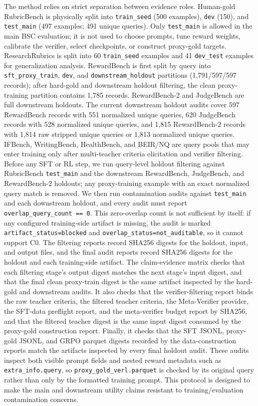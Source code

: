 The method relies on strict separation between evidence roles. Human-gold
RubricBench is physically split into \texttt{train\_seed} (500 examples),
\texttt{dev} (150), and \texttt{test\_main} (497 examples; 491 unique
queries). Only \texttt{test\_main} is
allowed in the main BSC evaluation; it is not used to choose prompts, tune
reward weights, calibrate the verifier, select checkpoints, or construct
proxy-gold targets. ResearchRubrics is split into 60
\texttt{train\_seed} examples and 41 \texttt{dev\_test} examples for
generalization analysis. RewardBench is first split by query into
\texttt{sft\_proxy\_train}, \texttt{dev}, and
\texttt{downstream\_holdout} partitions (1,791/597/597 records); after
hard-gold and downstream holdout filtering, the clean proxy-training partition
contains 1,785 records. RewardBench-2 and JudgeBench are full downstream
holdouts. The current downstream holdout audits cover 597 RewardBench records
with 551 normalized unique queries, 620 JudgeBench records with 528 normalized
unique queries, and 1,815 RewardBench-2 records with 1,814 raw stripped unique
queries or 1,813 normalized unique queries. IFBench, WritingBench, HealthBench,
and BEIR/NQ are query pools that
may enter training only after multi-teacher criteria elicitation and verifier
filtering. Before any SFT or RL step, we run query-level holdout filtering
against RubricBench \texttt{test\_main} and the downstream RewardBench,
JudgeBench, and RewardBench-2 holdouts; any proxy-training example with an exact
normalized query match is removed. We then run contamination audits against
\texttt{test\_main} and each downstream holdout, and every audit must report
\texttt{overlap\_query\_count == 0}. This zero-overlap count is not sufficient
by itself: if any configured training-side artifact is missing, the audit is
marked \texttt{artifact\_status=blocked} and
\texttt{overlap\_status=not\_auditable}, so it cannot support C0. The filtering reports record SHA256
digests for the holdout, input, and output files, and the final audit reports
record SHA256 digests for the holdout and each training-side artifact. The
claim-evidence matrix checks that each filtering stage's output digest matches
the next stage's input digest, and that the final clean proxy-train digest is
the same artifact inspected by the hard-gold and downstream audits. It also
checks that the verifier-filtering report binds the raw teacher criteria, the
filtered teacher criteria, the Meta-Verifier provider, the SFT-data preflight
report, and the meta-verifier budget report by SHA256, and that the filtered
teacher digest is the same input digest consumed by the proxy-gold construction
report. Finally, it checks that the SFT JSONL, proxy-gold JSONL, and GRPO
parquet digests recorded by the data-construction reports match the artifacts
inspected by every final holdout audit. These
audits inspect both visible prompt
fields and nested reward metadata such as \texttt{extra\_info.query}, so
\texttt{proxy\_gold\_verl.parquet} is checked by its original query rather than
only by the formatted training prompt. This protocol is designed to make the
main and downstream utility claims resistant to training/evaluation
contamination concerns.

